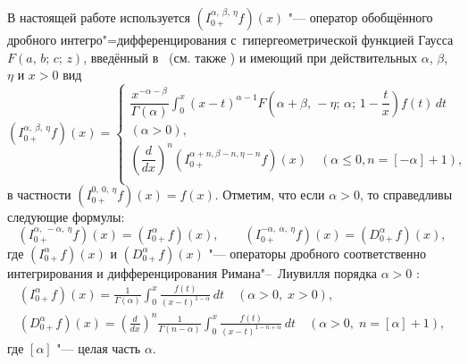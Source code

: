 В настоящей работе используется $\left(I^{\alpha,\:\beta,\:\eta}_{0+}f\right)(x)$ "--- оператор обобщённого дробного интегро"=дифференцирования с~гипергеометрической функцией Гаусса $F(a,\,b;\,c;\,z)$, введённый в~\cite{sayg:S} (см. также \cite[c.~326--327]{sayg:SKM}) и имеющий при
действительных $\alpha$, $\beta$, $\eta$ и $x>0$ вид
\begin{equation*}%
    \left(I^{\alpha,\:\beta,\:\eta}_{0+}f\right)(x)=\left\{
    \begin{array}{r}
    \displaystyle
      \dfrac{x^{-\alpha-\beta}}{\Gamma(\alpha)}\int_0^x(x-t)^{\alpha-1}F\left(\alpha+\beta,\,-\eta;\,\alpha;\,1-\dfrac{t}{x}\right)f(t)\,dt\\
      (\alpha>0),\\
      \left(\dfrac{d}{dx}\right)^{n}\left(I^{\alpha+n,\beta-n,\eta-n}_{0+}f\right)(x)\quad(\alpha\leqslant0,n=[-\alpha]+1),\\
    \end{array}
    \right.
\end{equation*}
в частности
    $\left(I^{0,\:0,\:\eta}_{0+}f\right)(x)=f(x).$
Отметим, что если $\alpha>0$, то справедливы следующие формулы:
\begin{equation}\label{operator's_property_a=-b}
  \left(I^{\alpha,\:-\alpha,\:\eta}_{0+}f\right)(x)=\left(I^{\alpha}_{0+}f\right)(x),\qquad
  \left(I^{-\alpha,\:\alpha,\:\eta}_{0+}f\right)(x)=\left(D^{\alpha}_{0+}f\right)(x),
\end{equation}
где $\left(I^{\alpha}_{0+}f\right)(x)$ и $\left(D^{\alpha}_{0+}f\right)(x)$ "--- операторы дробного
соответственно интегрирования и дифференцирования Римана"--~Лиувилля порядка $\alpha>0$
\cite[c.~42, 44]{sayg:SKM}:
\begin{gather}\label{riemann-liouville_derivative}
  \displaystyle
  \left(I^{\alpha}_{0+}f\right)(x)=\frac{1}{\Gamma(\alpha)}\int_0^x\frac{f(t)}{(x-t)^{1-\alpha}}\,dt\quad
  (\alpha>0,\;x>0),
\\
\label{riemann-liouville_integral}
  \displaystyle
  \left(D^{\alpha}_{0+}f\right)(x)=\left(\frac{d}{dx}\right)^{n}\frac{1}{\Gamma(n-\alpha)}\int_0^x\frac{f(t)}{(x-t)^{1-n+\alpha}}\,dt\quad
  (\alpha>0,\;n=[\alpha]+1),
\end{gather}
где $[\alpha]$ "--- целая часть $\alpha$.


